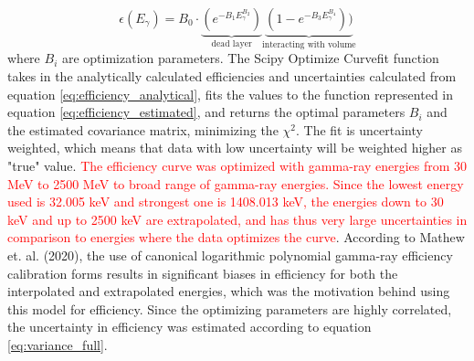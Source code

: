 \begin{equation} \label{eq:efficiency_estimated}
\epsilon(E_\gamma) =  B_0 \cdot \underbrace{(e^{-B_1 E_\gamma^{B_2}})}_\text{dead layer}  \underbrace{(1-e^{-B_3 E_\gamma^{B_4}}))}_\text{interacting with volume} 
\end{equation}
\noindent 
where $B_i$ are optimization parameters. The Scipy Optimize Curvefit function \cite{Virtanen2020} takes in the analytically calculated efficiencies and uncertainties calculated from equation \ref{eq:efficiency_analytical}, fits the values to the function represented in equation \ref{eq:efficiency_estimated}, and returns the optimal parameters $B_i$ and the estimated covariance matrix, minimizing the $\chi^2$. The fit is uncertainty weighted, which means that data with low uncertainty will be weighted higher as "true" value. \textcolor{red}{The efficiency curve was optimized with gamma-ray energies from 30 MeV to 2500 MeV to broad range of gamma-ray energies. Since the lowest energy used is 32.005 keV and strongest one is 1408.013 keV, the energies down to 30 keV and up to 2500 keV are extrapolated, and has thus very large uncertainties in comparison to energies where the data optimizes the curve}. According to Mathew et. al. (2020), the use of canonical logarithmic polynomial gamma-ray efficiency calibration forms results in significant biases in efficiency for both the interpolated and extrapolated energies\cite{MatthewsEricF.LewisAmandaM.Bernstein2020}, which was the motivation behind using this model for efficiency. Since the optimizing parameters are highly correlated, the uncertainty in efficiency was estimated according to equation \ref{eq:variance_full}. %
